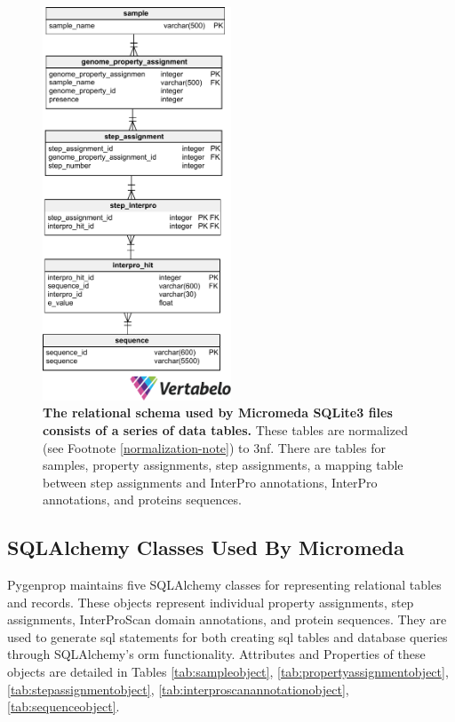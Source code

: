 \begin{figure}[!ht]
  \centering
	\includegraphics[width=0.50\textwidth]{media/micromeda_schema.pdf}
	 \caption[The relational schema used by Micromeda SQLite3 files consists of a series of data tables.]{\textbf{The relational schema used by Micromeda SQLite3 files consists of a series of data tables.} These tables are normalized (see Footnote \ref{normalization-note}) to \gls{3nf}. There are tables for samples, property assignments, step assignments, a mapping table between step assignments and InterPro annotations, InterPro annotations, and proteins sequences.}
	 \label{fig:micromedaschema}
\end{figure}

\subsection{SQLAlchemy Classes Used By Micromeda} \label{sqlalchemy-classes}

Pygenprop maintains five SQLAlchemy classes for representing relational tables and records. These objects represent individual property assignments, step assignments, InterProScan domain annotations, and protein sequences. They are used to generate \gls{sql} statements for both creating \gls{sql} tables and database queries through SQLAlchemy's \gls{orm} functionality. Attributes and Properties of these objects are detailed in Tables \ref{tab:sampleobject}, \ref{tab:propertyassignmentobject}, \ref{tab:stepassignmentobject}, \ref{tab:interproscanannotationobject}, \ref{tab:sequenceobject}.

